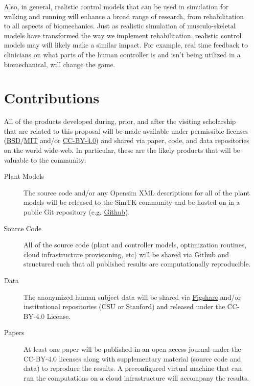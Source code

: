 \documentclass[11pt]{article}
\begin{document}
Also, in general, realistic control models that can be used in simulation for
walking and running will enhance a broad range of research, from rehabilitation
to all aspects of biomechanics. Just as realistic simulation of
musculo-skeletal models have transformed the way we implement rehabilitation,
realistic control models may will likely make a similar impact. For example,
real time feedback to clinicians on what parts of the human controller is and
isn't being utilized in a biomechanical, will change the game.

\section*{Contributions}

All of the products developed during, prior, and after the visiting scholarship
that are related to this proposal will be made available under permissible
licenses
(\href{http://opensource.org/licenses/BSD-2-Clause}{BSD}/\href{http://opensource.org/licenses/MIT}{MIT}
and/or \href{http://creativecommons.org/licenses/by/4.0/}{CC-BY-4.0}) and
shared via paper, code, and data repositories on the world wide web. In
particular, these are the likely products that will be valuable to the
community:

\begin{description}
  \item[Plant Models] The source code and/or any Opensim XML descriptions for
    all of the plant models will be released to the SimTK community and be
    hosted on in a public Git repository (e.g.
    \href{http://github.com}{Github}).
  \item[Source Code] All of the source code (plant and controller models,
    optimization routines, cloud infrastructure provisioning, etc) will be
    shared via Github and structured such that all published results are
    computationally reproducible.
  \item[Data] The anonymized human subject data will be shared via
    \href{http://figshare.com}{Figshare} and/or institutional repositories (CSU
    or Stanford) and released under the CC-BY-4.0 License.
  \item[Papers] At least one paper will be published in an open access journal
    under the CC-BY-4.0 licenses along with supplementary material (source code
    and data) to reproduce the results. A preconfigured virtual machine that
    can run the computations on a cloud infrastructure will accompany the
    results.
\end{description}
\end{document}
